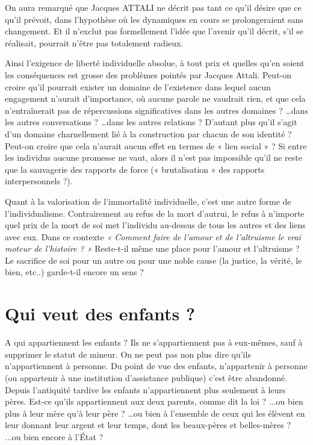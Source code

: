 On aura remarqué que Jacques ATTALI ne décrit pas tant ce qu'il désire que ce qu'il prévoit, dans l'hypothèse où les dynamiques en cours se prolongeraient sans changement. Et il n'exclut pas formellement l'idée que l'avenir qu'il décrit, s'il se réalisait, pourrait n'être pas totalement radieux. 



 Ainsi l'exigence de liberté individuelle absolue, à tout prix et quelles qu'en soient les conséquences est grosse des problèmes pointés par Jacques Attali. Peut-on croire qu'il pourrait exister un domaine de l'existence dans lequel aucun engagement n'aurait d'importance, où aucune parole ne vaudrait rien, et que cela n'entraînerait pas de répercussions significatives dans les autres domaines ? …dans les autres conversations ? …dans les autres relations ? D’autant plus qu'il s'agit d'un domaine charnellement lié à la construction par chacun de son identité ? Peut-on croire que cela n'aurait aucun effet en termes de « lien social » ? Si entre les individus aucune promesse ne vaut, alors il n’est pas impossible qu’il ne reste que la sauvagerie des rapports de force (« brutalisation » des rapports interpersonnels ?). 
 
 Quant à la valorisation de l'immortalité individuelle, c'est une autre forme de l'individualisme. Contrairement au refus de la mort d'autrui, le refus à n'importe quel prix de la mort de soi met l'individu au-dessus de tous les autres et des liens avec eux. Dans ce contexte \emph{« Comment faire de l'amour et de l'altruisme le vrai moteur de l'histoire ? »} Reste-t-il même une place pour l'amour et l'altruisme ? Le sacrifice de soi pour un autre ou pour une noble cause (la justice, la vérité, le bien, etc..) garde-t-il encore un sens ? 



 


\chapter{Qui veut des enfants ?} 

 
 A qui appartiennent les enfants ?  Ils ne s'appartiennent pas à eux-mêmes, sauf à supprimer le statut de mineur. On ne peut pas non plus dire qu'ils n'appartiennent à personne. Du point de vue des enfants, n'appartenir à personne (ou appartenir à une institution d'assistance publique) c'est être abandonné. 
 Depuis l’antiquité tardive les enfants n'appartiennent plus seulement à leurs pères. Est-ce qu'ils appartiennent aux deux parents, comme dit la loi ? ...ou bien plus à leur mère qu’à leur père ? …ou bien à l'ensemble de ceux qui les élèvent en leur donnant leur argent et leur temps, dont les beaux-pères et belles-mères ? ...ou bien encore à l'État ? 
 
